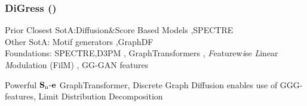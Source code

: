 \documentclass[./presentation.tex]{subfiles}
\begin{document}
\begin{frame}[t,label=digress]
  \frametitle{DiGress (\cite{vignacDiGressDiscreteDenoising2023b})}
  \vspace{-1cm}
\footnotesize
\begin{priorart}
{\footnotesize
    Prior Closest SotA:Diffusion\&Score Based Models \citep{niuPermutationInvariantGraph2020b,songGenerativeModelingEstimating2019b},SPECTRE \citep{martinkusSPECTRESpectralConditioning2022b}\\
    Other SotA: Motif generators \citep{maziarzLearningExtendMolecular2021},GraphDF\citep{luoGraphDFDiscreteFlow2021d}
\\
Foundations: SPECTRE,D3PM \citep{austinStructuredDenoisingDiffusion2021e}, GraphTransformers \citep{vaswaniAttentionAllYou2017c,yunGraphTransformerNetworks2019b}, \textit{F}eaturew\textit{i}se \textit{L}inear \textit{M}odulation (FilM) \citep{perezFiLMVisualReasoning2018b}, GG-GAN features
 }
  \end{priorart}
  \begin{contributions}
    Powerful $\operatorname{\mathbf{S}_n\mathbf{-e}}$ GraphTransformer, Discrete Graph Diffusion enables use of GGG-features, Limit Distribution Decomposition
  \end{contributions}
  \vspace{-0.5cm}
  \begin{columns}
        \footnotesize
    \begin{column}{0.5\textwidth}
    \end{column}
    \begin{column}{0.5\textwidth}
    \end{column}
  \end{columns}
\end{frame}
\end{document}
